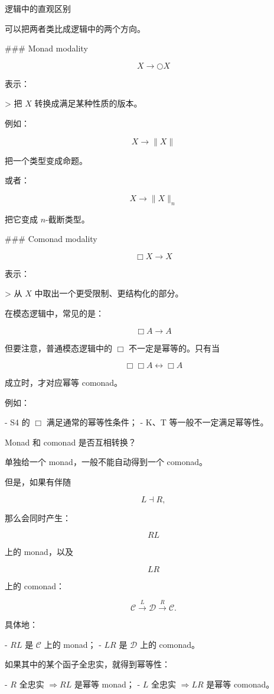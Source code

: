 \documentclass{beamer}
\begin{document}
\begin{frame}{逻辑中的直观区别}
\begin{markdown}
可以把两者类比成逻辑中的两个方向。

### Monad modality

$$
X\to \bigcirc X
$$

表示：

> 把 $X$ 转换成满足某种性质的版本。

例如：

$$
X\to \|X\|
$$

把一个类型变成命题。

或者：

$$
X\to \|X\|_n
$$

把它变成 $n$-截断类型。

### Comonad modality

$$
\Box X\to X
$$

表示：

> 从 $X$ 中取出一个更受限制、更结构化的部分。

在模态逻辑中，常见的是：

$$
\Box A\to A
$$

但要注意，普通模态逻辑中的 $\Box$ 不一定是幂等的。只有当

$$
\Box\Box A\leftrightarrow \Box A
$$

成立时，才对应幂等 comonad。

例如：

- S4 的 $\Box$ 满足通常的幂等性条件；
- K、T 等一般不一定满足幂等性。
\end{markdown}
\end{frame}

\begin{frame}{Monad 和 comonad 是否互相转换？}
\begin{markdown}
单独给一个 monad，一般不能自动得到一个 comonad。

但是，如果有伴随

$$
L\dashv R,
$$

那么会同时产生：

$$
RL
$$

上的 monad，以及

$$
LR
$$

上的 comonad：

$$
\mathcal C
\overset{L}{\longrightarrow}
\mathcal D
\overset{R}{\longrightarrow}
\mathcal C.
$$

具体地：

- $RL$ 是 $\mathcal C$ 上的 monad；
- $LR$ 是 $\mathcal D$ 上的 comonad。

如果其中的某个函子全忠实，就得到幂等性：

- $R$ 全忠实 $\Rightarrow RL$ 是幂等 monad；
- $L$ 全忠实 $\Rightarrow LR$ 是幂等 comonad。
\end{markdown}
\end{frame}
\end{document}
